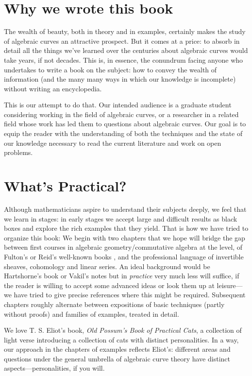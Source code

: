 \section{Why we wrote this book}

The wealth of beauty, both in theory and in examples, certainly makes the study of algebraic curves an attractive prospect. But it comes at a price: to absorb in detail all the things we've learned over the centuries about algebraic curves would take years, if not decades. This is, in essence, the conundrum facing anyone who undertakes to write a book on the subject: how to convey the wealth of information  (and the many many ways in which our knowledge is incomplete) without writing an encyclopedia.

This is our attempt to do  that. Our intended audience is a graduate student considering working in the field of algebraic curves, or a researcher in a related field whose work has led them to questions about algebraic curves. Our goal is to equip the reader with the understanding of both the techniques and the state of our knowledge necessary to read the current literature and work on open problems.

\section{What's Practical?}

Although mathematicians aspire to understand their subjects deeply, we feel that we learn in stages: in early stages we accept large and difficult results as black boxes and explore the rich examples that they yield. That is how we have tried to organize this book: 
We begin with two chapters that we hope will bridge the gap between first courses in algebraic geometry/commutative algebra at the level,  of Fulton's or  Reid's well-known books \cite{}, \cite{?} and the professional language of invertible sheaves, cohomology and linear series. An ideal background would
be Hartshorne's book \cite{Hartshorne1977} or Vakil's notes \cite{} but in \emph{practice} very much less will suffice, if the reader is willing to accept some advanced ideas or look them up at leisure---we have tried to give precise references where this might be required. Subsequent chapters roughly alternate between expositions of basic techniques (partly without proofs) and families of examples, treated in detail. 

We love T. S. Eliot's book, \emph{Old Possum's Book of Practical Cats}, a collection of light verse introducing a collection of cats with distinct personalities. In a way, our approach in the chapters of examples reflects Eliot's: different areas and questions under the general umbrella of algebraic curve theory have distinct aspects---personalities, if you will.


